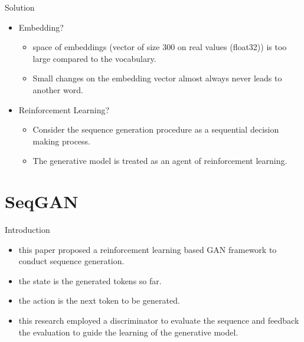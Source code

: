\documentclass[10pt]{beamer}
\newcommand{\subtitlepage}[3]{\title{#1}\subtitle{#2}\author{#3}\date{}\begin{frame}[plain]\titlepage\end{frame}}
\begin{document}
	\begin{frame}{Solution}
		\begin{itemize}
			\pause
			\item Embedding? 
			\begin{itemize}
				\pause
				\item space of embeddings (vector of size 300 on real values (float32)) is too large compared to the vocabulary. 
				\pause
				\item Small changes on the embedding vector almost always never leads to another word.
			\end{itemize}
			\pause
			\item Reinforcement Learning? 
			\begin{itemize}
				\pause
				\item Consider the sequence generation procedure as a sequential decision making process.
				\pause
				\item The generative model is treated as an agent of reinforcement learning.
			\end{itemize}
		\end{itemize}
	\end{frame}
	
	\part{SeqGAN}
	\subtitlepage{}{SeqGAN: Sequence Generative Adversarial Nets with Policy Gradient}{Lantao Yu, Weinan Zhang, Jun Wang, Yong Yu\\NIPS 2016\\arXiv: 1609.05473}
	\begin{frame}{Introduction}
		\begin{itemize}
			\item this paper proposed a reinforcement learning based GAN framework to conduct sequence generation.
			\pause
			\item the state is the generated tokens so far.
			\pause
			\item the action is the next token to be generated.
			\pause
			\item this research employed a discriminator to evaluate the sequence and feedback the evaluation to guide the learning of the generative model.
		\end{itemize}
	\end{frame}
\end{document}

